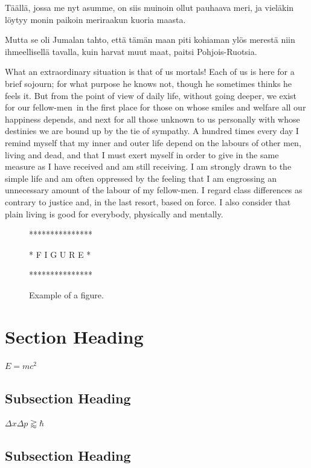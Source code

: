 \documentclass[dissertation,math,vertlayout,pdfa,colorlinks,nologo]{aaltoseries}
\begin{document}
\begin{quoting} 
Täällä, jossa me nyt asumme, on siis muinoin ollut pauhaava
meri, ja vieläkin löytyy monin paikoin meriraakun kuoria maasta. 

Mutta se oli Jumalan tahto, että tämän maan piti kohiaman ylös merestä niin
ihmeellisellä tavalla, kuin harvat muut maat, paitsi Pohjois-Ruotsia.
\end{quoting}
What an extraordinary situation is that of us mortals! Each of us is here for a
brief sojourn; for what purpose he knows not, though he sometimes thinks he
feels it. But from the point of view of daily life, without going deeper, we
exist for our fellow-men~in the first place for those on whose smiles and
welfare all our happiness depends, and next for all those unknown to us
personally with whose destinies we are bound up by the tie of sympathy. A
hundred times every day I remind myself that my inner and outer life depend on
the labours of other men, living and dead, and that I must exert myself in
order to give in the same measure as I have received and am still receiving. I
am strongly drawn to the simple life and am often oppressed by the feeling that
I am engrossing an unnecessary amount of the labour of my fellow-men. I regard
class differences as contrary to justice and, in the last resort, based on
force. I also consider that plain living is good for everybody, physically and
mentally. 

\begin{figure}

***************

* F I G U R E *

***************

\caption{Example of a figure.}
\end{figure}

\section{Section Heading}
$E=mc^2$
\lipsum[5-6]

\cite{WikiBooks2008:LaTeX}
\subsection{Subsection Heading}
$\Delta x\Delta p \gtrapprox \hbar$
\lipsum[7-8]
\subsection{Subsection Heading}
\lipsum[9-10]
\end{document}
